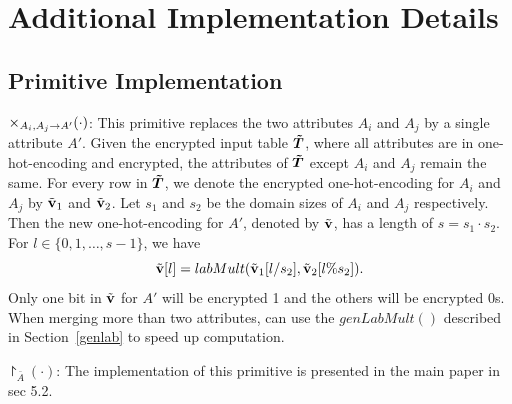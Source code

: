 \section{Additional Implementation Details}\label{app:implement}

\subsection{Primitive Implementation}\label{app:implement_primitives}

 $\times_{A_i,A_j\rightarrow A'}(\cdot)$: This primitive replaces the two attributes $A_i$ and $A_j$ by a single attribute $A'$. Given the encrypted input table $\boldsymbol{\tilde{T}}$, where all attributes are in one-hot-encoding and encrypted, the attributes of $\boldsymbol{\tilde{T}}$ except $A_i$ and $A_j$ remain the same. For every row in $\boldsymbol{\tilde{T}}$, we denote the encrypted one-hot-encoding for $A_i$ and $A_j$ by $\tilde{\bf{v}}_1$ and $\tilde{\bf{v}}_2$.  Let $s_1$ and $s_2$ be the domain sizes of $A_i$ and $A_j$ respectively. Then the new one-hot-encoding for $A'$, denoted by $\tilde{\bf{v}}$, has a length of $s=s_1\cdot s_2$. For $l\in \{0,1,\ldots, s-1\}$, we have $$\tilde{\bf{v}}[l] = labMult(\tilde{\bf{v}}_1[l/s_2], \tilde{\bf{v}}_2[l\%s_2]).$$
Only one bit in $\tilde{\bf{v}}$ for $A'$ will be encrypted 1 and the others will be encrypted 0s. When merging more than two attributes, \system can use the $genLabMult()$ described in Section~\ref{genlab} to speed up computation.



 $\project_{\bar{A}}(\cdot)$: The implementation of this primitive is presented in the main paper in sec 5.2.

